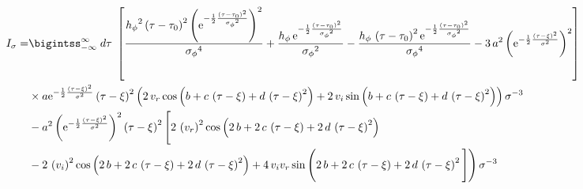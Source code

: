 \begin{landscape}
\begin{align}
I_{\sigma} = & \bigintss_{-\infty}^{\infty} \; d\tau\; \left[ \frac{{{ h_{\phi}}}^{2} \left( \tau-{ \tau_0} \right) ^{2} \left( {
{\rm e}^{-\frac{1}{2}{\frac { \left( \tau-{ \tau_0} \right) ^{2}}{{{ 
\sigma_{\phi}}}^{2}}}}} \right) ^{2}}{{{ \sigma_{\phi}}}^{4}}+\frac{{ h_{\phi}}
\,{{\rm e}^{-\frac{1}{2}{\frac { \left( \tau-{ \tau_0} \right) ^{2}}{{{ 
\sigma_{\phi}}}^{2}}}}}}{{{ \sigma_{\phi}}}^{2}}-\frac{{ h_{\phi}}\, \left( \tau-{
 \tau_0} \right) ^{2}{{\rm e}^{-\frac{1}{2}{\frac { \left( \tau-{ \tau_0}
 \right) ^{2}}{{{ \sigma_{\phi}}}^{2}}}}}}{{{ \sigma_{\phi}}}^{4}}-3\,{a
}^{2} \left( {{\rm e}^{-\frac{1}{2}{\frac { \left( \tau-\xi \right) ^{2}}{
{\sigma}^{2}}}}} \right) ^{2} \right] \nonumber \\
& \times a{{\rm e}^{-\frac{1}{2}{\frac {
 \left( \tau-\xi \right) ^{2}}{{\sigma}^{2}}}}} \left( \tau-\xi
 \right) ^{2} \left( 2\,v_r \cos
 \left( b+c\, \left( \tau-\xi \right) +d\, \left( \tau-\xi
 \right) ^{2} \right) +2\,v_i \sin
 \left( b+c\, \left( \tau-\xi \right) +d\, \left( \tau-\xi
 \right) ^{2} \right)  \right) {\sigma}^{-3} \nonumber \\
 &-{a}^{2} \left( {{\rm e}^{
-\frac{1}{2}{\frac { \left( \tau-\xi \right) ^{2}}{{\sigma}^{2}}}}}
 \right) ^{2} \left( \tau-\xi \right) ^{2} \Bigg[ 2\, \left(v_r \right) ^{2}\cos \left( 2\,b+2\,c\,
 \left( \tau-\xi \right) +2\,d\, \left( \tau-\xi \right) ^{2}
 \right) \nonumber \\
 &-2\, \left( v_i  \right) ^{2}
\cos \left( 2\,b+2\,c\, \left( \tau-\xi \right) +2\,d\, \left( \tau-{
 \xi} \right) ^{2} \right) +4\,v_i v_r \sin \left( 2\,b+2\,c\, \left( \tau-{
 \xi} \right) +2\,d\, \left( \tau-\xi \right) ^{2} \Bigg] 
 \right) {\sigma}^{-3}
\end{align}


\end{landscape}
